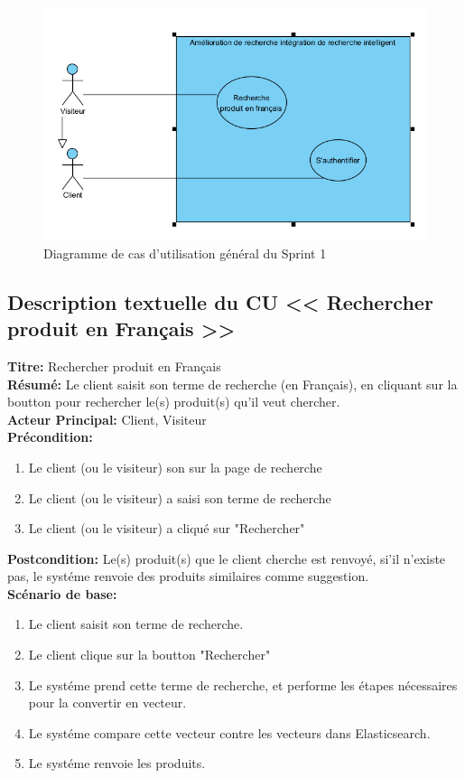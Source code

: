 \begin{figure}[H]
	\centering
	\includegraphics[width=1\textwidth]{logos/cusprint1.png}
	\caption{Diagramme de cas d'utilisation général du Sprint 1}
	\label{fig:recherchefrancais}
\end{figure}

\subsection{Description textuelle du CU << Rechercher produit en Français >>}
\noindent
\textbf{Titre:} Rechercher produit en Français \\
\textbf{Résumé:} Le client saisit son terme de recherche (en Français), en cliquant sur la boutton pour rechercher le(s) produit(s) qu'il veut chercher. \\
\textbf{Acteur Principal:} Client, Visiteur \\
\textbf{Précondition:} \begin{enumerate}
	\item Le client (ou le visiteur) son sur la page de recherche
	\item Le client (ou le visiteur) a saisi son terme de recherche
	\item Le client (ou le visiteur) a cliqué sur "Rechercher"
\end{enumerate}
\textbf{Postcondition:} Le(s) produit(s) que le client cherche est renvoyé, si'il n'existe pas, le systéme renvoie des produits similaires comme suggestion. \\
\textbf{Scénario de base: }
\begin{enumerate}
	\item Le client saisit son terme de recherche.
	\item Le client clique sur la boutton "Rechercher"
	\item Le systéme prend cette terme de recherche, et performe les étapes nécessaires pour la convertir en vecteur.
	\item Le systéme compare cette vecteur contre les vecteurs dans Elasticsearch.
	\item Le systéme renvoie les produits.
\end{enumerate}

